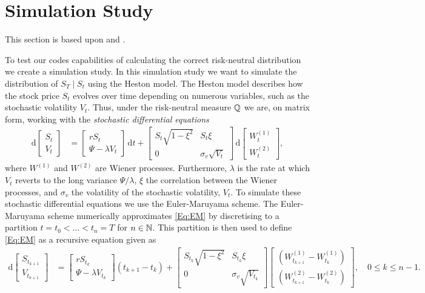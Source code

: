 \section{Simulation Study}
This section is based upon \citep{Hull} and \citep{Gatheral}.

To test our codes capabilities of calculating the correct risk-neutral distribution we create a simulation study. In this simulation study we want to simulate the distribution of $S_T\mid S_t$ using the Heston model. The Heston model describes how the stock price $S_t$ evolves over time depending on numerous variables, such as the stochastic volatility $V_t$. Thus, under the risk-neutral measure $\mathbb{Q}$ we are, on matrix form, working with the \emph{stochastic differential equations}
\begin{align}\label{Eq:EM}
    \mathrm{d}\begin{bmatrix}S_t\\V_t\end{bmatrix} &= \begin{bmatrix}rS_t\\\Psi-\lambda V_t\end{bmatrix}\,\mathrm{d}t + \begin{bmatrix}S_t\sqrt{1-\xi^2}&S_t\xi\\0&\sigma_v\sqrt{V_t}\end{bmatrix}\,\mathrm{d}\begin{bmatrix}W^{(1)}_t\\W^{(2)}_t\end{bmatrix},
\end{align}
where $W^{(1)}$ and $W^{(2)}$ are Wiener processes. Furthermore, $\lambda$ is the rate at which $V_t$ reverts to the long variance $\Psi/\lambda$, $\xi$ the correlation between the Wiener processes, and $\sigma_v$ the volatility of the stochastic volatility, $V_t$. To simulate these stochastic differential equations we use the Euler-Maruyama scheme. The Euler-Maruyama scheme numerically approximates \eqref{Eq:EM} by discretising to a partition $t=t_0<\dots<t_n=T$ for $n\in\mathbb{N}$. This partition is then used to define \eqref{Eq:EM} as a recursive equation given as
\begin{align*}
        \mathrm{d}\begin{bmatrix}S_{t_{k+1}}\\V_{t_{k+1}}\end{bmatrix} &= \begin{bmatrix}rS_{t_k}\\\Psi-\lambda V_{t_k}\end{bmatrix}\left(t_{k+1}-t_k\right) + \begin{bmatrix}S_{t_k}\sqrt{1-\xi^2}&S_{t_k}\xi\\0&\sigma_v\sqrt{V_{t_k}}\end{bmatrix}\begin{bmatrix}(W^{(1)}_{t_{k+1}}-W^{(1)}_{t_k})\\(W^{(2)}_{t_{k+1}}-W^{(2)}_{t_k})\end{bmatrix},\quad 0\leq k\leq n-1.
\end{align*}
